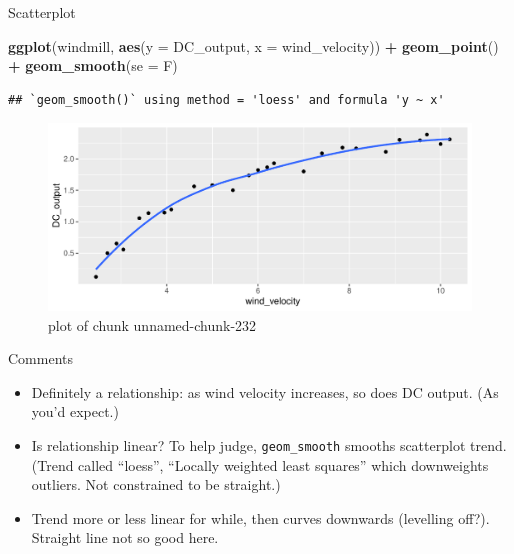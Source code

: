 \documentclass[ignorenonframetext,]{beamer}
\newenvironment{Shaded}{\begin{snugshade}}{\end{snugshade}}
\newcommand{\DataTypeTok}[1]{\textcolor[rgb]{0.13,0.29,0.53}{#1}}
\newcommand{\KeywordTok}[1]{\textcolor[rgb]{0.13,0.29,0.53}{\textbf{#1}}}
\newcommand{\NormalTok}[1]{#1}
\newcommand{\OperatorTok}[1]{\textcolor[rgb]{0.81,0.36,0.00}{\textbf{#1}}}
\newcommand{\StringTok}[1]{\textcolor[rgb]{0.31,0.60,0.02}{#1}}
\providecommand{\tightlist}{%
  \setlength{\itemsep}{0pt}\setlength{\parskip}{0pt}}
\begin{document}
\begin{frame}[fragile]{Scatterplot}
\protect\hypertarget{scatterplot}{}

\begin{Shaded}
\begin{Highlighting}[]
\KeywordTok{ggplot}\NormalTok{(windmill, }\KeywordTok{aes}\NormalTok{(}\DataTypeTok{y =}\NormalTok{ DC_output, }\DataTypeTok{x =}\NormalTok{ wind_velocity)) }\OperatorTok{+}
\StringTok{  }\KeywordTok{geom_point}\NormalTok{() }\OperatorTok{+}\StringTok{ }\KeywordTok{geom_smooth}\NormalTok{(}\DataTypeTok{se =}\NormalTok{ F)}
\end{Highlighting}
\end{Shaded}

\begin{verbatim}
## `geom_smooth()` using method = 'loess' and formula 'y ~ x'
\end{verbatim}

\begin{figure}
\centering
\includegraphics{figure/unnamed-chunk-232-1.pdf}
\caption{plot of chunk unnamed-chunk-232}
\end{figure}

\end{frame}

\begin{frame}[fragile]{Comments}
\protect\hypertarget{comments-12}{}

\begin{itemize}
\tightlist
\item
  Definitely a relationship: as wind velocity increases, so does DC
  output. (As you'd expect.)
\item
  Is relationship linear? To help judge, \texttt{geom\_smooth} smooths
  scatterplot trend. (Trend called ``loess'', ``Locally weighted least
  squares'' which downweights outliers. Not constrained to be straight.)
\item
  Trend more or less linear for while, then curves downwards (levelling
  off?). Straight line not so good here.
\end{itemize}

\end{frame}
\end{document}
